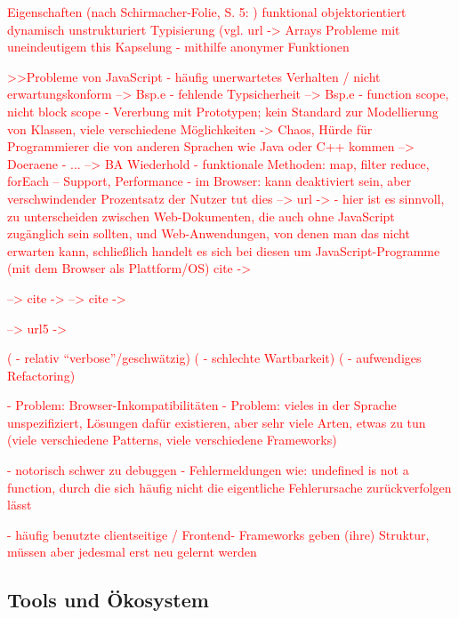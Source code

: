 \documentclass[a4paper, 12pt, hidelinks, listof=totoc, listoftables=totoc, bibliography=totoc]{scrreprt}
\newcommand{\TODO}[1]{\textcolor{red}{#1}\newline}
\begin{document}
\TODO{Eigenschaften (nach Schirmacher-Folie, S. 5: %
)}
\TODO{	funktional}
\TODO{	objektorientiert}
\TODO{	dynamisch}
\TODO{	unstrukturiert}
\TODO{	Typisierung (vgl. url -> %
}
\TODO{	Arrays}
\TODO{	Probleme mit uneindeutigem this}
\TODO{	Kapselung - mithilfe anonymer Funktionen}
	
                             
\TODO{>>Probleme von JavaScript}
\TODO{- häufig unerwartetes Verhalten / nicht erwartungskonform  -->  Bsp.e}
\TODO{- fehlende Typsicherheit  -->  Bsp.e}
\TODO{- function scope, nicht block scope}
\TODO{- Vererbung mit Prototypen; kein Standard zur Modellierung von Klassen, viele verschiedene Möglichkeiten  ->  Chaos, Hürde für Programmierer die von anderen Sprachen wie Java oder C++ kommen}
\TODO{-->  Doeraene}
\TODO{- ...}
\TODO{-->  BA Wiederhold}
\TODO{- funktionale Methoden: map, filter reduce, forEach -- Support, Performance}
\TODO{- im Browser: kann deaktiviert sein, aber verschwindender Prozentsatz der Nutzer tut dies  --> url -> %
}
\TODO{	- hier ist es sinnvoll, zu unterscheiden zwischen Web-Dokumenten, die auch ohne JavaScript zugänglich sein sollten, und Web-Anwendungen, von denen man das nicht erwarten kann, schließlich handelt es sich bei diesen um JavaScript-Programme (mit dem Browser als Plattform/OS)}
\TODO{	cite -> %
}

\TODO{-->  cite -> %
}
\TODO{-->  cite -> %
}

\TODO{-->  url5 -> %
}


\TODO{(  - relativ "`verbose"'/geschwätzig)}
\TODO{(  - schlechte Wartbarkeit)}
\TODO{(  - aufwendiges Refactoring)}


\TODO{- Problem: Browser-Inkompatibilitäten}
\TODO{- Problem: vieles in der Sprache unspezifiziert, Lösungen dafür existieren, aber sehr viele Arten, etwas zu tun (viele verschiedene Patterns, viele verschiedene Frameworks)}

\TODO{- notorisch schwer zu debuggen - Fehlermeldungen wie: undefined is not a function, durch die sich häufig nicht die eigentliche Fehlerursache zurückverfolgen lässt}


\TODO{- häufig benutzte clientseitige / Frontend- Frameworks geben (ihre) Struktur, müssen aber jedesmal erst neu gelernt werden}


\subsection{Tools und Ökosystem}
\end{document}

